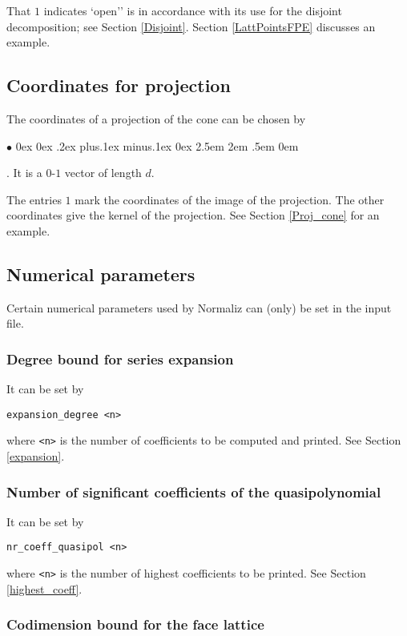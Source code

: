 \documentclass[12pt,a4paper]{scrartcl}
\newcommand{\stdli}{ \topsep0ex \partopsep0ex %
\parsep.2ex plus.1ex minus.1ex \itemsep0ex%
\leftmargin2.5em \labelwidth2em \labelsep.5em \rightmargin0em}%
\renewenvironment{itemize}{\begin{list}{{$\bullet$}}{\stdli}}{\end{list}}
\theoremstyle{definition}
\def\itemtt[#1]{\item[\textbf{\ttt{#1}}]}
\def\ttt{\texttt}
\begin{document}
That $1$ indicates `open'' is in accordance with its use for the disjoint decomposition; see Section \ref{Disjoint}. Section \ref{LattPointsFPE} discusses an example.

\subsection{Coordinates for projection}

The coordinates of a projection of the cone can be chosen by
\begin{itemize}
	\itemtt[projection\_coordinates]. It is a $0$-$1$ vector of length $d$.
\end{itemize}
The entries $1$ mark the coordinates of the image of the projection. The other coordinates give the kernel of the projection. See Section \ref{Proj_cone} for an example.

\subsection{Numerical parameters}

Certain numerical parameters used by Normaliz can (only) be set in the input file. 

\subsubsection{Degree bound for series expansion}

It can be set by
\begin{Verbatim}
expansion_degree <n>
\end{Verbatim}
where \verb|<n>| is the number of coefficients to be computed and printed. See Section \ref{expansion}.

\subsubsection{Number of significant coefficients of the quasipolynomial}

It can be set by
\begin{Verbatim}
nr_coeff_quasipol <n>
\end{Verbatim}
where \verb|<n>| is the number of highest coefficients to be printed. See Section \ref{highest_coeff}.

\subsubsection{Codimension bound for the face lattice}
\end{document}
